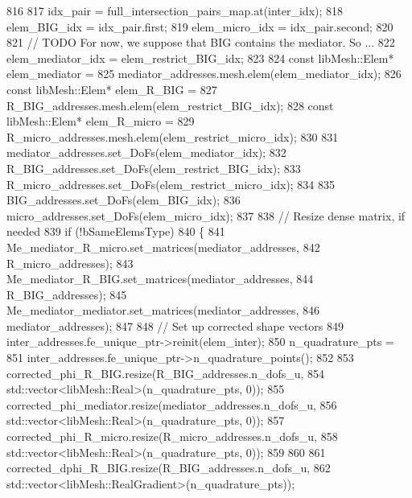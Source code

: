 \begin{DoxyCode}
816 
817             idx\_pair = full\_intersection\_pairs\_map.at(inter\_idx);
818             elem\_BIG\_idx = idx\_pair.first;
819             elem\_micro\_idx = idx\_pair.second;
820 
821             \textcolor{comment}{// TODO For now, we suppose that BIG contains the mediator. So ...}
822             elem\_mediator\_idx = elem\_restrict\_BIG\_idx;
823 
824             \textcolor{keyword}{const} libMesh::Elem* elem\_mediator =
825                     mediator\_addresses.mesh.elem(elem\_mediator\_idx);
826             \textcolor{keyword}{const} libMesh::Elem* elem\_R\_BIG =
827                     R\_BIG\_addresses.mesh.elem(elem\_restrict\_BIG\_idx);
828             \textcolor{keyword}{const} libMesh::Elem* elem\_R\_micro =
829                     R\_micro\_addresses.mesh.elem(elem\_restrict\_micro\_idx);
830 
831             mediator\_addresses.set\_DoFs(elem\_mediator\_idx);
832             R\_BIG\_addresses.set\_DoFs(elem\_restrict\_BIG\_idx);
833             R\_micro\_addresses.set\_DoFs(elem\_restrict\_micro\_idx);
834 
835             BIG\_addresses.set\_DoFs(elem\_BIG\_idx);
836             micro\_addresses.set\_DoFs(elem\_micro\_idx);
837 
838             \textcolor{comment}{// Resize dense matrix, if needed}
839             \textcolor{keywordflow}{if} (!bSameElemsType)
840             \{
841                 Me\_mediator\_R\_micro.set\_matrices(mediator\_addresses,
842                         R\_micro\_addresses);
843                 Me\_mediator\_R\_BIG.set\_matrices(mediator\_addresses,
844                         R\_BIG\_addresses);
845                 Me\_mediator\_mediator.set\_matrices(mediator\_addresses,
846                         mediator\_addresses);
847 
848                 \textcolor{comment}{// Set up corrected shape vectors}
849                 inter\_addresses.fe\_unique\_ptr->reinit(elem\_inter);
850                 n\_quadrature\_pts =
851                         inter\_addresses.fe\_unique\_ptr->n\_quadrature\_points();
852 
853                 corrected\_phi\_R\_BIG.resize(R\_BIG\_addresses.n\_dofs\_u,
854                         std::vector<libMesh::Real>(n\_quadrature\_pts, 0));
855                 corrected\_phi\_mediator.resize(mediator\_addresses.n\_dofs\_u,
856                         std::vector<libMesh::Real>(n\_quadrature\_pts, 0));
857                 corrected\_phi\_R\_micro.resize(R\_micro\_addresses.n\_dofs\_u,
858                         std::vector<libMesh::Real>(n\_quadrature\_pts, 0));
859 
860 
861                     corrected\_dphi\_R\_BIG.resize(R\_BIG\_addresses.n\_dofs\_u,
862                             std::vector<libMesh::RealGradient>(n\_quadrature\_pts));

\end{DoxyCode}
